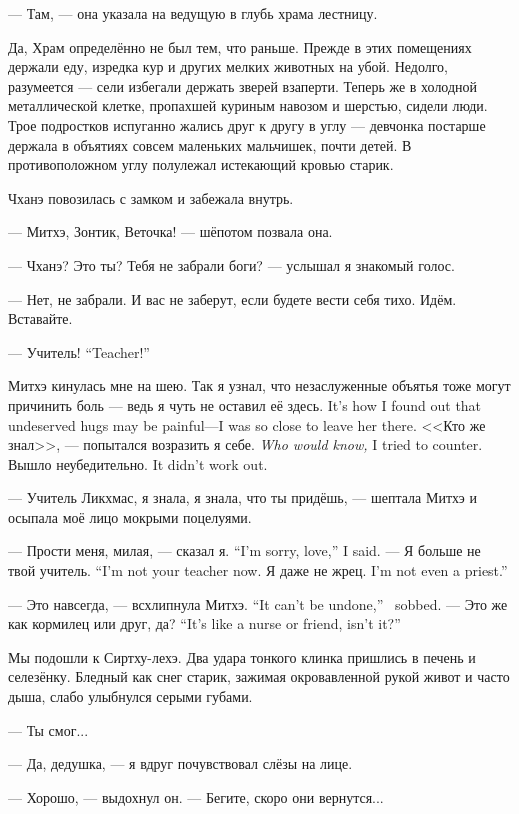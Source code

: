 --- Там, --- она указала на ведущую в глубь храма лестницу.

Да, Храм определённо не был тем, что раньше.
Прежде в этих помещениях держали еду, изредка кур и других мелких животных на убой.
Недолго, разумеется --- сели избегали держать зверей взаперти.
Теперь же в холодной металлической клетке, пропахшей куриным навозом и шерстью, сидели люди.
Трое подростков испуганно жались друг к другу в углу --- девчонка постарше держала в объятиях совсем маленьких мальчишек, почти детей.
В противоположном углу полулежал истекающий кровью старик.

Чханэ повозилась с замком и забежала внутрь.

--- Митхэ, Зонтик, Веточка! --- шёпотом позвала она.

--- Чханэ?
Это ты?
Тебя не забрали боги? --- услышал я знакомый голос.

--- Нет, не забрали.
И вас не заберут, если будете вести себя тихо.
Идём.
Вставайте.

{--- Учитель!}
{``Teacher!''}

Митхэ кинулась мне на шею.
{Так я узнал, что незаслуженные объятья тоже могут причинить боль --- ведь я чуть не оставил её здесь.}
{It's how I found out that undeserved hugs may be painful---I was so close to leave her there.}
{<<Кто же знал>>, --- попытался возразить я себе.}
{\textit{Who would know,} I tried to counter.}
{Вышло неубедительно.}
{It didn't work out.}

--- Учитель Ликхмас, я знала, я знала, что ты придёшь, --- шептала Митхэ и осыпала моё лицо мокрыми поцелуями.

{--- Прости меня, милая, --- сказал я.}
{``I'm sorry, love,'' I said.}
{--- Я больше не твой учитель.}
{``I'm not your teacher now.}
{Я даже не жрец.}
{I'm not even a priest.''}

{--- Это навсегда, --- всхлипнула Митхэ.}
{``It can't be undone,'' \Mitchoe\ sobbed.}
{--- Это же как кормилец или друг, да?}
{``It's like a nurse or friend, isn't it?''}

Мы подошли к Сиртху-лехэ.
Два удара тонкого клинка пришлись в печень и селезёнку.
Бледный как снег старик, зажимая окровавленной рукой живот и часто дыша, слабо улыбнулся серыми губами.

--- Ты смог...

--- Да, дедушка, --- я вдруг почувствовал слёзы на лице.

--- Хорошо, --- выдохнул он.
--- Бегите, скоро они вернутся...

